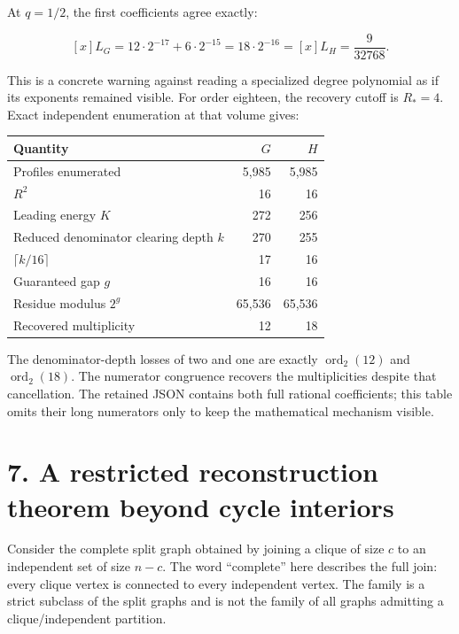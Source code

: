 \documentclass[
  11pt,
  a4paper,
]{report}
\begin{document}
At \(q=1/2\), the first coefficients agree exactly:

\[
[x]L_G
 =12\cdot2^{-17}+6\cdot2^{-15}
 =18\cdot2^{-16}
 =[x]L_H
 =\frac9{32768}.
\]

This is a concrete warning against reading a specialized degree
polynomial as if its exponents remained visible. For order eighteen, the
recovery cutoff is \(R_*=4\). Exact independent enumeration at that
volume gives:

\begin{longtable}[]{@{}lrr@{}}
\toprule\noalign{}
Quantity & \(G\) & \(H\) \\
\midrule\noalign{}
\endhead
\bottomrule\noalign{}
\endlastfoot
Profiles enumerated & 5,985 & 5,985 \\
\(R^2\) & 16 & 16 \\
Leading energy \(K\) & 272 & 256 \\
Reduced denominator clearing depth \(k\) & 270 & 255 \\
\(\lceil k/16\rceil\) & 17 & 16 \\
Guaranteed gap \(g\) & 16 & 16 \\
Residue modulus \(2^g\) & 65,536 & 65,536 \\
Recovered multiplicity & 12 & 18 \\
\end{longtable}

The denominator-depth losses of two and one are exactly
\(\operatorname{ord}_2(12)\) and \(\operatorname{ord}_2(18)\). The
numerator congruence recovers the multiplicities despite that
cancellation. The retained JSON contains both full rational
coefficients; this table omits their long numerators only to keep the
mathematical mechanism visible.

\hypertarget{a-restricted-reconstruction-theorem-beyond-cycle-interiors}{%
\section{7. A restricted reconstruction theorem beyond cycle
interiors}\label{a-restricted-reconstruction-theorem-beyond-cycle-interiors}}

Consider the complete split graph obtained by joining a clique of size
\(c\) to an independent set of size \(n-c\). The word ``complete'' here
describes the full join: every clique vertex is connected to every
independent vertex. The family is a strict subclass of the split graphs
and is not the family of all graphs admitting a clique/independent
partition.
\end{document}
